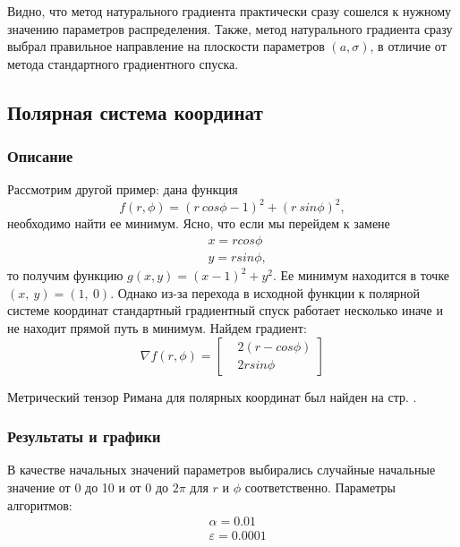 \documentclass[a4paper,12pt]{article}
\begin{document}
        Видно, что метод натурального градиента практически сразу сошелся к нужному значению параметров распределения.
        Также, метод натурального градиента сразу выбрал правильное направление на плоскости параметров $(a, \sigma)$, 
        в отличие от метода стандартного градиентного спуска.

\newpage

\subsection{Полярная система координат}
\subsubsection{Описание}
        Рассмотрим другой пример: дана функция $$f(r, \phi) = (r ~ cos \phi -1)^2 + (r ~ sin \phi)^2,$$ необходимо найти ее минимум.
        Ясно, что если мы перейдем к замене
        $$
            \begin{aligned}
                & x = r cos \phi \\
                & y = r sin \phi,
            \end{aligned}
        $$
        то получим функцию $g(x, y) = (x - 1)^2 + y^2$. Ее минимум находится в точке $(x,~ y) = (1,~ 0)$. Однако из-за
        перехода в исходной функции к полярной системе координат стандартный градиентный спуск работает несколько иначе и не находит прямой путь в минимум.
        Найдем градиент:
        $$
            \nabla f(r, \phi) = 
            \left[
                \begin{aligned}
                    & 2(r - cos \phi) \\
                    & 2r sin \phi
                \end{aligned}
            \right]
        $$
        
        Метрический тензор Римана для полярных координат был найден на стр. \pageref{PolarTensor}.
        \newpage

\subsubsection{Результаты и графики}

        В качестве начальных значений параметров выбирались случайные начальные значение от 0 до 10 и от 0 до $2\pi$ для $r$ и $\phi$ соответственно.
        Параметры алгоритмов:
        $$
            \begin{aligned}
                & \alpha = 0.01 \\
                & \varepsilon = 0.0001
            \end{aligned}
        $$
\end{document}
